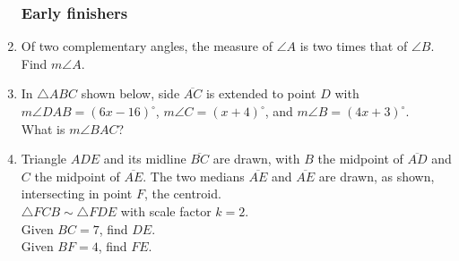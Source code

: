 \documentclass[12pt, twoside]{article}
\begin{document}
\begin{enumerate}
\newpage
\subsubsection*{Early finishers}

  \item Of two complementary angles, the measure of $\angle A$ is two times that of $\angle B$. Find $m\angle A$. \vspace{3.5cm} 


  \item In  $\triangle ABC$ shown below, side $\overline{AC}$ is extended to point $D$ with $m\angle DAB=(6x-16)^\circ$, $m\angle C=(x+4)^\circ$, and $m\angle B=(4x+3)^\circ$. \\[0.25cm]
  What is $m\angle BAC$?
  \begin{flushright}
    \end{flushright}

  \item Triangle $ADE$ and its midline $\overline{BC}$ are drawn, with $B$ the midpoint of $\overline{AD}$ and $C$ the midpoint of $\overline{AE}$. The two medians $\overline{AE}$ and $\overline{AE}$ are drawn, as shown, intersecting in point $F$, the centroid.\\[0.25cm]
  $\triangle FCB \sim \triangle FDE$ with scale factor $k=2$.\\[0.25cm]
  Given $BC=7$, find $DE$. \\[0.25cm] Given $BF=4$, find $FE$. %
  \begin{flushright}
    \end{flushright} \vspace{1cm}


\end{enumerate}
\end{document}
